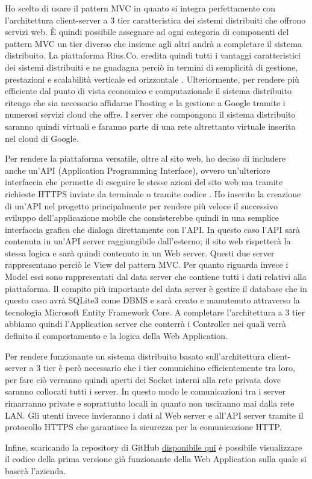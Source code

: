Ho scelto di usare il pattern MVC in quanto si integra perfettamente con l'architettura client-server a 3 tier caratteristica dei sistemi distribuiti che offrono servizi web. È quindi possibile assegnare ad ogni categoria di componenti del pattern MVC un tier diverso che insieme agli altri andrà a completare il sistema distribuito. La piattaforma Rius.Co. eredita quindi tutti i vantaggi caratteristici dei sistemi distribuiti e ne guadagna perciò in termini di semplicità di gestione, prestazioni e scalabilità verticale ed orizzontale \cite{3Tier}. Ulteriormente, per rendere più efficiente dal punto di vista economico e computazionale il sistema distribuito ritengo che sia necessario affidarne l'hosting e la gestione a Google tramite i numerosi servizi cloud che offre. I server che compongono il sistema distribuito saranno quindi virtuali e faranno parte di una rete altrettanto virtuale inserita nel cloud di Google.  
\medskip

Per rendere la piattaforma versatile, oltre al sito web, ho deciso di includere anche un'API (Application Programming Interface), ovvero un'ulteriore interfaccia che permette di eseguire le stesse azioni del sito web ma tramite richieste HTTPS inviate da terminale o tramite codice \cite{API}. Ho inserito la creazione di un'API nel progetto principalmente per rendere più veloce il successivo sviluppo dell'applicazione mobile che consisterebbe quindi in una semplice interfaccia grafica che dialoga direttamente con l'API. In questo caso l'API sarà contenuta in un'API server raggiungibile dall'esterno; il sito web rispetterà la stessa logica e sarà quindi contenuto in un Web server. Questi due server rappresentano perciò le View del pattern MVC. Per quanto riguarda invece i Model essi sono rappresentati dal data server che contiene tutti i dati relativi alla piattaforma. Il compito più importante del data server è gestire il database che in questo caso avrà SQLite3 come DBMS e sarà creato e manutenuto attraverso la tecnologia Microsoft Entity Framework Core. A completare l'architettura a 3 tier abbiamo quindi l'Application server che conterrà i Controller nei quali verrà definito il comportamento e la logica della Web Application. 
\medskip

Per rendere funzionante un sistema distribuito basato sull'architettura client-server a 3 tier è però necessario che i tier comunichino efficientemente tra loro, per fare ciò verranno quindi aperti dei Socket interni alla rete privata dove saranno collocati tutti i server. In questo modo le comunicazioni tra i server rimarranno private e soprattutto locali in quanto non usciranno mai dalla rete LAN. Gli utenti invece invieranno i dati al Web server e all'API server tramite il protocollo HTTPS che garantisce la sicurezza per la comunicazione HTTP. 
\medskip

Infine, scaricando la repository di GitHub \href{https://github.com/MauroPello/elaborato}{disponibile qui} \cite{GitHub} è possibile visualizzare il codice della prima versione già funzionante della Web Application sulla quale si baserà l'azienda.  